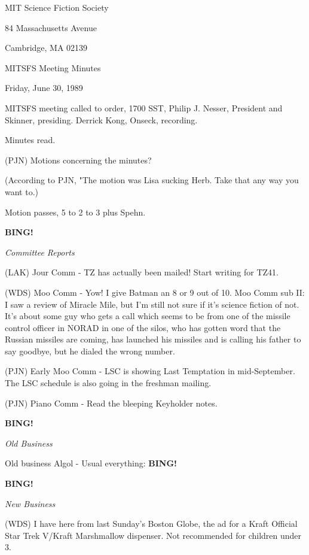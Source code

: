 \documentclass[12pt]{article}
\newcommand{\bing}{{\bf BING!} }
\newcommand{\goto}[1]{\bing \vskip 12pt \centerline{{\em{#1}}}}
\begin{document}
\begin{center}

MIT Science Fiction Society 

84 Massachusetts Avenue

Cambridge, MA 02139

\vspace{12pt}

MITSFS Meeting Minutes 

Friday, June 30, 1989

\end{center}
 
\vspace{18pt}

\setlength{\parskip}{6pt}

\noindent
MITSFS meeting called to order, 1700 SST, Philip J. Nesser, President and Skinner, presiding. Derrick Kong, Onseck, recording.

Minutes read.

(PJN) Motions concerning the minutes?

(According to PJN, "The motion was Lisa sucking Herb.  Take that any way you want to.)

Motion passes, 5 to 2 to 3 plus Spehn. 

\goto{Committee Reports}

(LAK) Jour Comm - TZ has actually been mailed! Start writing for TZ41.

(WDS) Moo Comm - Yow!  I give Batman an 8 or 9 out of 10. Moo Comm sub II: I saw a review of Miracle Mile, but I'm still not sure if it's science fiction of not. It's about some guy who gets a call which seems to be from one of the missile control officer in NORAD in one of the silos, who has gotten word that the Russian missiles are coming, has launched his missiles and is calling his father to say goodbye, but he dialed the wrong number.

(PJN) Early Moo Comm - LSC is showing Last Temptation in mid-September. The LSC schedule is also going in the freshman mailing.

(PJN) Piano Comm - Read the bleeping Keyholder notes.

\goto{Old Business}

Old business Algol - Usual everything: \bing

\goto{New Business}

(WDS) I have here from last Sunday's Boston Globe, the ad for a Kraft Official Star Trek V/Kraft Marshmallow dispenser. Not recommended for children under 3.
\end{document}
